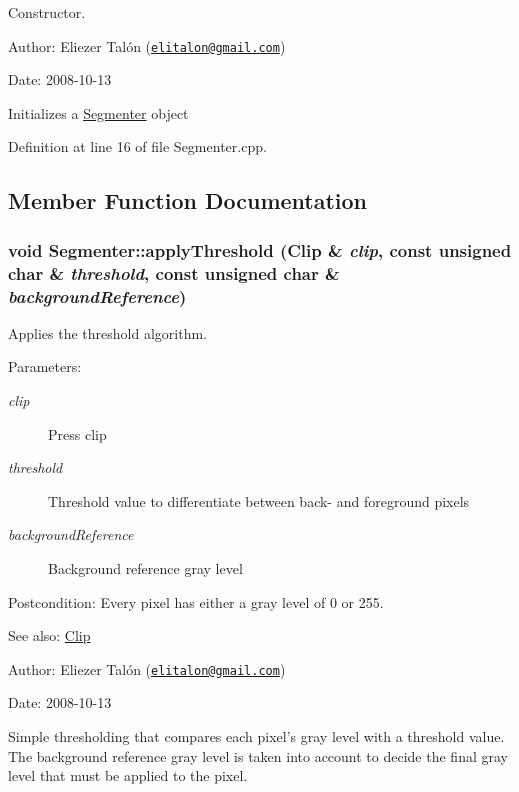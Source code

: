 Constructor. 

\begin{Desc}
\item[Author:]Eliezer Talón (\href{mailto:elitalon@gmail.com}{\tt elitalon@gmail.com}) \end{Desc}
\begin{Desc}
\item[Date:]2008-10-13\end{Desc}
Initializes a \hyperlink{class_segmenter}{Segmenter} object 

Definition at line 16 of file Segmenter.cpp.

\subsection{Member Function Documentation}
\hypertarget{class_segmenter_6854315e3320f9d9a8ece14cbb8570ee}{
\subsubsection[applyThreshold]{\setlength{\rightskip}{0pt plus 5cm}void Segmenter::applyThreshold ({\bf Clip} \& {\em clip}, \/  const unsigned char \& {\em threshold}, \/  const unsigned char \& {\em backgroundReference})}}
\label{class_segmenter_6854315e3320f9d9a8ece14cbb8570ee}


Applies the threshold algorithm. 

\begin{Desc}
\item[Parameters:]
\begin{description}
\item[{\em clip}]Press clip \item[{\em threshold}]Threshold value to differentiate between back- and foreground pixels \item[{\em backgroundReference}]Background reference gray level\end{description}
\end{Desc}
\begin{Desc}
\item[Postcondition:]Every pixel has either a gray level of 0 or 255.\end{Desc}
\begin{Desc}
\item[See also:]\hyperlink{class_clip}{Clip}\end{Desc}
\begin{Desc}
\item[Author:]Eliezer Talón (\href{mailto:elitalon@gmail.com}{\tt elitalon@gmail.com}) \end{Desc}
\begin{Desc}
\item[Date:]2008-10-13\end{Desc}
Simple thresholding that compares each pixel's gray level with a threshold value. The background reference gray level is taken into account to decide the final gray level that must be applied to the pixel. 

